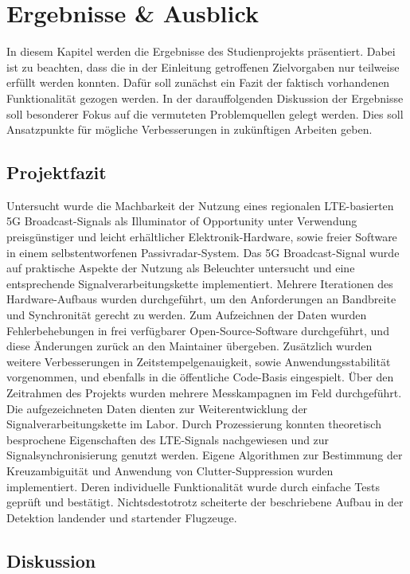 \chapter{Ergebnisse \& Ausblick}

In diesem Kapitel werden die Ergebnisse des Studienprojekts präsentiert. Dabei ist zu beachten, dass die in der Einleitung getroffenen Zielvorgaben nur teilweise erfüllt werden konnten. Dafür soll zunächst ein Fazit der faktisch vorhandenen Funktionalität gezogen werden. In der darauffolgenden Diskussion der Ergebnisse soll besonderer Fokus auf die vermuteten Problemquellen gelegt werden. Dies soll Ansatzpunkte für mögliche Verbesserungen in zukünftigen Arbeiten geben.

\section{Projektfazit}

Untersucht wurde die Machbarkeit der Nutzung eines regionalen LTE-basierten 5G Broadcast-Signals als Illuminator of Opportunity unter Verwendung preisgünstiger und leicht erhältlicher Elektronik-Hardware, sowie freier Software in einem selbstentworfenen Passivradar-System. Das 5G Broadcast-Signal wurde auf praktische Aspekte der Nutzung als Beleuchter untersucht und eine entsprechende Signalverarbeitungskette implementiert. Mehrere Iterationen des Hardware-Aufbaus wurden durchgeführt, um den Anforderungen an Bandbreite und Synchronität gerecht zu werden. Zum Aufzeichnen der Daten wurden Fehlerbehebungen in frei verfügbarer Open-Source-Software durchgeführt, und diese Änderungen zurück an den Maintainer übergeben. Zusätzlich wurden weitere Verbesserungen in Zeitstempelgenauigkeit, sowie Anwendungsstabilität vorgenommen, und ebenfalls in die öffentliche Code-Basis eingespielt. Über den Zeitrahmen des Projekts wurden mehrere Messkampagnen im Feld durchgeführt. Die aufgezeichneten Daten dienten zur Weiterentwicklung der Signalverarbeitungskette im Labor. Durch Prozessierung konnten theoretisch besprochene Eigenschaften des LTE-Signals nachgewiesen und zur Signalsynchronisierung genutzt werden. Eigene Algorithmen zur Bestimmung der Kreuzambiguität und Anwendung von Clutter-Suppression wurden implementiert. Deren individuelle Funktionalität wurde durch einfache Tests geprüft und bestätigt. Nichtsdestotrotz scheiterte der beschriebene Aufbau in der Detektion landender und startender Flugzeuge.

\section{Diskussion}

